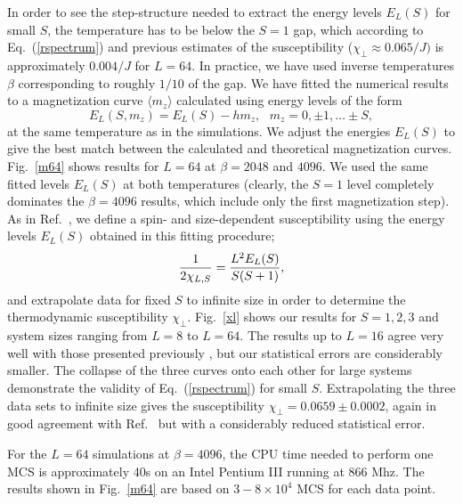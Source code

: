\documentclass[10pt,pre,aps,twocolumn,showpacs,superscriptaddress,
floatfix]{revtex4}
\begin{document}
In order to see the step-structure needed to extract the energy levels 
$E_L(S)$ for small $S$, the temperature has to be below the $S=1$ gap,
which according to Eq.~(\ref{rspectrum}) and previous estimates of the 
susceptibility ($\chi_\perp \approx 0.065/J)$ is approximately $0.004/J$
for $L=64$. In practice, we have used inverse temperatures $\beta$
corresponding to roughly $1/10$ of the gap. We have fitted the numerical 
results to a magnetization curve $\langle m_z\rangle$ calculated using 
energy levels of the form
\begin{equation}
E_L(S,m_z) = E_L(S) - hm_z, ~~~ m_z = 0,\pm 1,\ldots \pm S,
\end{equation} 
at the same temperature as in the simulations. We adjust the energies
$E_L(S)$ to give the best match between the calculated and theoretical
magnetization curves. Fig.~\ref{m64} shows results for $L=64$ at $\beta=2048$ 
and $4096$. We used the same fitted levels $E_L(S)$ at both 
temperatures (clearly, the $S=1$ level completely dominates the $\beta=4096$ 
results, which include only the first magnetization step). As in
Ref.~, we define a spin- and size-dependent 
susceptibility using the energy levels $E_L(S)$ obtained in this
fitting procedure;
\begin{equation}
{1\over 2\chi_{L,S}} = {L^2 E_L(S) \over S(S+1)},
\end{equation}
and extrapolate data for fixed $S$ to infinite size in order to determine the 
thermodynamic susceptibility $\chi_\perp$. Fig.~\ref{xl} shows 
our results for $S=1,2,3$ and system sizes ranging from $L=8$ to $L=64$. The
results up to $L=16$ agree very well with those presented previously 
\cite{lavalle}, but our statistical errors are considerably smaller. The 
collapse of the three curves onto each other for large systems demonstrate 
the validity of Eq.~(\ref{rspectrum}) for small $S$. Extrapolating the three 
data sets to infinite size gives the susceptibility $\chi_\perp = 0.0659 \pm 
0.0002$, again in good agreement with Ref.~ but with 
a considerably reduced statistical error.

For the $L=64$ simulations at $\beta=4096$, the CPU time needed to perform
one MCS is approximately 40s on an Intel Pentium III running at 866 Mhz.
The results shown in Fig.~\ref{m64} are based on $3-8 \times 10^4$ MCS
for each data point.
\end{document}
